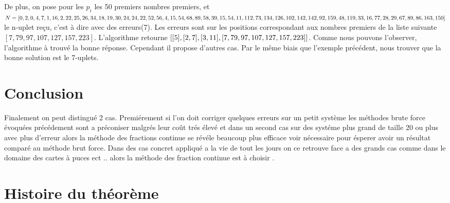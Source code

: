 \documentclass[a4paper, 11pt]{report}
\begin{document}
De plus, on pose pour les $p_i$ les 50 premiers nombres premiers, et 
$N=[0, 2, 0, 4, 7, 1, 16, 2, 22, 25, 26, 34, 18, 19, 30, 24, 24, 22, 52, 56, 4, 15, 54, 68, 
89,\newline 58, 39, 15, 54, 11, 112, 73, 134, 126, 102, 142, 142, 92, 159, 48, 119, 33, 16, 77, 28,
 \newline 29, 67, 89, 86, 163, 150]$ le n-uplet reçu, c'est à dire avec des erreurs(7). 
Les erreurs sont sur les positions correspondant aux nombres premiers de la liste suivante $[7, 79, 97, 107, 127, 157, 223]$. 
L'algorithme retourne $[[5], [2, 7], [3, 11], \newline [7, 79, 97, 107, 127, 157, 223]]$. Comme nous pouvons l'observer, l'algorithme à trouvé la bonne réponse. Cependant il propose d'autres cas. Par le même biais que l'exemple précédent, nous trouver que la bonne solution est le 7-uplets.


\newpage
 
\chapter*{Conclusion}
Finalement on peut distingué 2 cas. Premiérement si l'on doit corriger quelques erreurs sur un petit système 
les méthodes brute force évoquées précédement sont a préconiser malgrés leur coût trés élevé
et dans un second cas sur des systéme plus grand de taille 20 ou plus avec plus d'erreur alors la méthode des fractions continue
se révéle beaucoup plus efficace voir nécessaire pour ésperer avoir un résultat comparé au méthode brut force.
Dans des cas concret appliqué a la vie de tout les jours on ce retrouve face a des grands cas comme dans le domaine des cartes à puces ect ..
alors la méthode des fraction continue est à choisir .
\newpage

\chapter*{Histoire du théorème}
\end{document}
